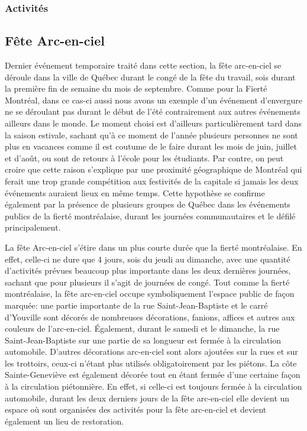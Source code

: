 \subsubsection{Activités}
\label{subsec:activitesfiertemontreal}



\subsection{Fête Arc-en-ciel}
\label{subsec:fetearcenciel}
Dernier événement temporaire traité dans cette section, la fête arc-en-ciel se déroule dans la ville de Québec durant le congé de la fête du travail, sois durant la première fin de semaine du mois de septembre.
Comme pour la Fierté Montréal, dans ce cas-ci aussi nous avons un exemple d'un événement d'envergure ne se déroulant pas durant le début de l'été contrairement aux autres événements ailleurs dans le monde.
Le moment choisi est d'ailleurs particulièrement tard dans la saison estivale, sachant qu'à ce moment de l'année plusieurs personnes ne sont plus en vacances comme il est coutume de le faire durant les mois de juin, juillet et d'août, ou sont de retours à l'école pour les étudiants.
Par contre, on peut croire que cette raison s'explique par une proximité géographique de Montréal qui ferait une trop grande compétition aux festivités de la capitale si jamais les deux événements auraient lieux en même temps.
Cette hypothèse se confirme également par la présence de plusieurs groupes de Québec dans les événements publics de la fierté montréalaise, durant les journées communautaires et le défilé principalement.

La fête Arc-en-ciel s'étire dans un plus courte durée que la fierté montréalaise.
En effet, celle-ci ne dure que 4 jours, sois du jeudi au dimanche, avec une quantité d'activités prévues beaucoup plus importante dans les deux dernières journées, sachant que pour plusieurs il s'agit de journées de congé.
Tout comme la fierté montréalaise, la fête arc-en-ciel occupe symboliquement l'espace public de façon marquée: une partie importante de la rue Saint-Jean-Baptiste et le carré d'Youville sont décorés de nombreuses décorations, fanions, affices et autres aux couleurs de l'arc-en-ciel.
Également, durant le samedi et le dimanche, la rue Saint-Jean-Baptiste sur une partie de sa longueur est fermée à la circulation automobile.
D'autres décorations arc-en-ciel sont alors ajoutées sur la rues et sur les trottoirs, ceux-ci n'étant plus utilisés obligatoirement par les piétons.
La côte Sainte-Geneviève est également décorée tout en étant fermée d'une certaine façon à la circulation piétonnière.
En effet, si celle-ci est toujours fermée à la circulation automobile, durant les deux derniers jours de la fête arc-en-ciel elle devient un espace où sont organisées des activités pour la fête arc-en-ciel et devient également un lieu de restoration.

